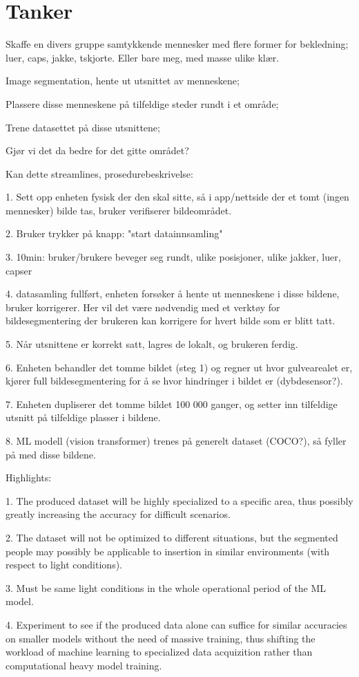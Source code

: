 \section{Tanker}
Skaffe en divers gruppe samtykkende mennesker med flere former for bekledning; luer, caps, jakke, tskjorte. Eller bare meg, med masse ulike klær.

Image segmentation, hente ut utsnittet av menneskene;

Plassere disse menneskene på tilfeldige steder rundt i et område;

Trene datasettet på disse utsnittene;

Gjør vi det da bedre for det gitte området?


Kan dette streamlines, prosedurebeskrivelse:

1. Sett opp enheten fysisk der den skal sitte, så i app/nettside der et tomt (ingen mennesker) bilde tas, bruker verifiserer bildeområdet.

2. Bruker trykker på knapp: "start datainnsamling"

3. 10min: bruker/brukere beveger seg rundt, ulike posisjoner, ulike jakker, luer, capser

4. datasamling fullført, enheten forsøker å hente ut menneskene i disse bildene, bruker korrigerer. Her vil det være nødvendig med et verktøy for bildesegmentering der brukeren kan korrigere for hvert bilde som er blitt tatt.

5. Når utsnittene er korrekt satt, lagres de lokalt, og brukeren ferdig.

6. Enheten behandler det tomme bildet (steg 1) og regner ut hvor gulvearealet er, kjører full bildesegmentering for å se hvor hindringer i bildet er (dybdesensor?). 

7. Enheten dupliserer det tomme bildet 100 000 ganger, og setter inn tilfeldige utsnitt på tilfeldige plasser i bildene. 

8. ML modell (vision transformer) trenes på generelt dataset (COCO?), så fyller på med disse bildene.

Highlights:

1. The produced dataset will be highly specialized to a specific area, thus possibly greatly increasing the accuracy for difficult scenarios.

2. The dataset will not be optimized to different situations, but the segmented people may possibly be applicable to insertion in similar environments (with respect to light conditions). 

3. Must be same light conditions in the whole operational period of the ML model.

4. Experiment to see if the produced data alone can suffice for similar accuracies on smaller models without the need of massive training, thus shifting the workload of machine learning to specialized data acquizition rather than computational heavy model training.
